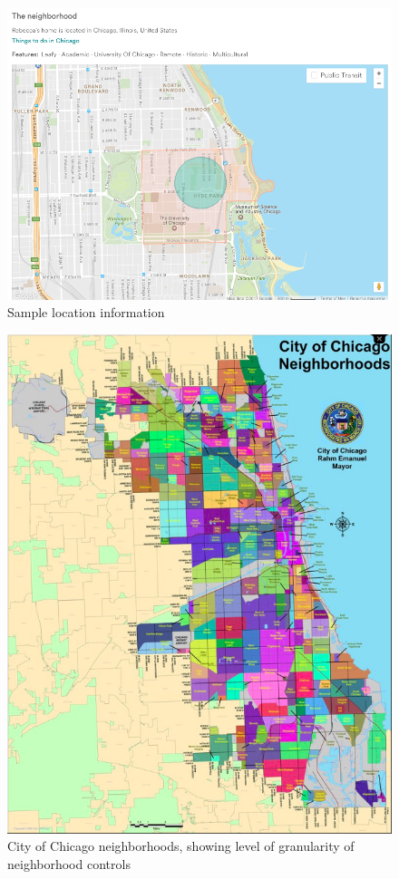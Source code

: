 \begin{figure}\centering
\includegraphics[width=.8\textwidth]{figures/sample5-location}
\caption{Sample location information}
\end{figure}
\begin{figure}\centering
\includegraphics[width=.8\textwidth]{figures/chicago_city_neighborhoods}
\caption[City of Chicago neighborhoods]{City of Chicago neighborhoods, showing level of granularity of neighborhood controls}
\end{figure}


